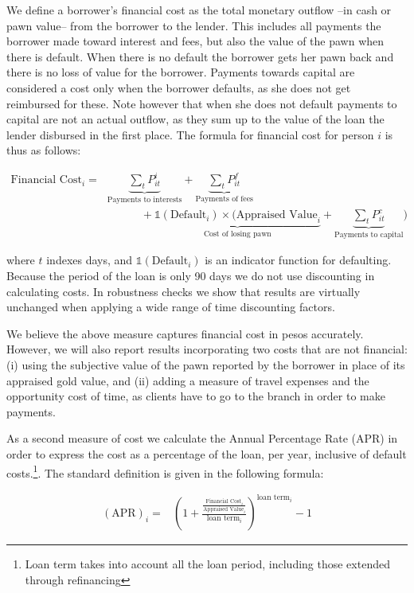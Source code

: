 \documentclass[oneside,11pt]{article}
\begin{document}
We define a borrower's financial cost as the total monetary outflow --in cash or pawn value-- from the borrower to the lender. This includes all payments the borrower made toward interest and fees, but also the value of the pawn when there is default. When there is no default the borrower gets her pawn back and there is no loss of value for the borrower. Payments towards capital are considered a cost only when the borrower defaults, as she does not get reimbursed for these. Note however that when she does not default payments to capital are not an actual outflow, as they sum up to the value of the loan the lender disbursed in the first place. The formula for financial cost for person $i$ is thus as follows:

\begin{align*}
    \text{Financial Cost}_i =&  \underbrace{\sum_t P^i_{it}}_{\text{Payments to interests}} + \underbrace{\sum_t P^f_{it}}_{\text{Payments of fees}}   \\
    &\quad\qquad + \underbrace{\mathds{1}(\text{Default}_i) \times (\text{Appraised Value}_i}_{\text{Cost of losing pawn}} + \underbrace{\sum_t P^c_{it}}_{\text{Payments to capital}})
\end{align*}

\noindent where $t$ indexes days, and $\mathds{1}(\text{Default}_i)$ is an indicator function for defaulting. Because the period of the loan is only 90 days we do not use discounting in calculating costs.  In robustness checks we show that results are virtually unchanged when applying a wide range of time discounting factors.

We believe the above measure captures financial cost in pesos accurately. However, we will also report results incorporating two costs that are not financial: (i) using the subjective value of the pawn reported by the borrower in place of its appraised gold value, and (ii) adding a measure of travel expenses and the opportunity cost of time, as clients have to go to the branch in order to make payments.

As a second measure of cost we calculate the Annual Percentage Rate (APR) in order to express the cost as a percentage of the loan, per year, inclusive of default costs.\footnote{Loan term takes into account all the loan period, including those extended through refinancing}. The standard definition is given in the following formula:


\begin{align*}
    (\text{APR})_i =&\left( 1 + \frac{\frac{\text{Financial Cost}_i}{\text{Appraised Value}_i}}{\text{loan term}_i}\right)^{\text{loan term}_i}-1 
\end{align*}
\end{document}
